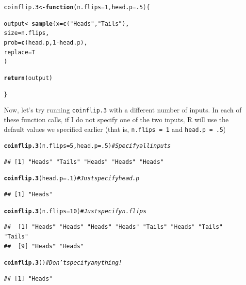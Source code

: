 \documentclass{tufte-book}\usepackage[]{graphicx}\usepackage[]{color}
\makeatletter
\newcommand{\hlnum}[1]{\textcolor[rgb]{0.686,0.059,0.569}{#1}}%
\newcommand{\hlstr}[1]{\textcolor[rgb]{0.192,0.494,0.8}{#1}}%
\newcommand{\hlcom}[1]{\textcolor[rgb]{0.678,0.584,0.686}{\textit{#1}}}%
\newcommand{\hlopt}[1]{\textcolor[rgb]{0,0,0}{#1}}%
\newcommand{\hlstd}[1]{\textcolor[rgb]{0.345,0.345,0.345}{#1}}%
\newcommand{\hlkwa}[1]{\textcolor[rgb]{0.161,0.373,0.58}{\textbf{#1}}}%
\newcommand{\hlkwb}[1]{\textcolor[rgb]{0.69,0.353,0.396}{#1}}%
\newcommand{\hlkwc}[1]{\textcolor[rgb]{0.333,0.667,0.333}{#1}}%
\newcommand{\hlkwd}[1]{\textcolor[rgb]{0.737,0.353,0.396}{\textbf{#1}}}%
\newenvironment{kframe}{%
 \def\at@end@of@kframe{}%
 \ifinner\ifhmode%
  \def\at@end@of@kframe{\end{minipage}}%
  \begin{minipage}{\columnwidth}%
 \fi\fi%
 \def\FrameCommand##1{\hskip\@totalleftmargin \hskip-\fboxsep
 \colorbox{shadecolor}{##1}\hskip-\fboxsep
     \hskip-\linewidth \hskip-\@totalleftmargin \hskip\columnwidth}%
 \MakeFramed {\advance\hsize-\width
   \@totalleftmargin\z@ \linewidth\hsize
   \@setminipage}}%
 {\par\unskip\endMakeFramed%
 \at@end@of@kframe}
\newenvironment{knitrout}{}{} %
\makeatother
\begin{document}
\begin{footnotesize}
\begin{knitrout}
\color{fgcolor}\begin{kframe}
\begin{alltt}
\hlstd{coinflip.3} \hlkwb{<-} \hlkwa{function} \hlstd{(}\hlkwc{n.flips} \hlstd{=} \hlnum{1}\hlstd{,} \hlkwc{head.p} \hlstd{=} \hlnum{.5}\hlstd{) \{}

  \hlstd{output} \hlkwb{<-} \hlkwd{sample}\hlstd{(}\hlkwc{x} \hlstd{=} \hlkwd{c}\hlstd{(}\hlstr{"Heads"}\hlstd{,} \hlstr{"Tails"}\hlstd{),}
                   \hlkwc{size} \hlstd{= n.flips,}
                   \hlkwc{prob} \hlstd{=} \hlkwd{c}\hlstd{(head.p,} \hlnum{1} \hlopt{-} \hlstd{head.p),}
                   \hlkwc{replace} \hlstd{= T}
                   \hlstd{)}

  \hlkwd{return}\hlstd{(output)}

\hlstd{\}}
\end{alltt}
\end{kframe}
\end{knitrout}

Now, let's try running \texttt{coinflip.3} with a different number of inputs. In each of these function calls, if I do not specify one of the two inputs, R will use the default values we specified earlier (that is, \texttt{n.flips = 1} and \texttt{head.p = .5})

\begin{knitrout}
\color{fgcolor}\begin{kframe}
\begin{alltt}
\hlkwd{coinflip.3}\hlstd{(}\hlkwc{n.flips} \hlstd{=} \hlnum{5}\hlstd{,} \hlkwc{head.p} \hlstd{=} \hlnum{.5}\hlstd{)}  \hlcom{# Specify all inputs}
\end{alltt}
\begin{verbatim}
## [1] "Heads" "Tails" "Heads" "Heads" "Heads"
\end{verbatim}
\begin{alltt}
\hlkwd{coinflip.3}\hlstd{(}\hlkwc{head.p} \hlstd{=} \hlnum{.1}\hlstd{)}  \hlcom{# Just specify head.p}
\end{alltt}
\begin{verbatim}
## [1] "Heads"
\end{verbatim}
\begin{alltt}
\hlkwd{coinflip.3}\hlstd{(}\hlkwc{n.flips} \hlstd{=} \hlnum{10}\hlstd{)} \hlcom{# Just specify n.flips}
\end{alltt}
\begin{verbatim}
##  [1] "Heads" "Heads" "Heads" "Heads" "Tails" "Heads" "Tails" "Tails"
##  [9] "Heads" "Heads"
\end{verbatim}
\begin{alltt}
\hlkwd{coinflip.3}\hlstd{()}  \hlcom{# Don't specify anything!}
\end{alltt}
\begin{verbatim}
## [1] "Heads"
\end{verbatim}
\end{kframe}
\end{knitrout}


\end{footnotesize}
\end{document}

